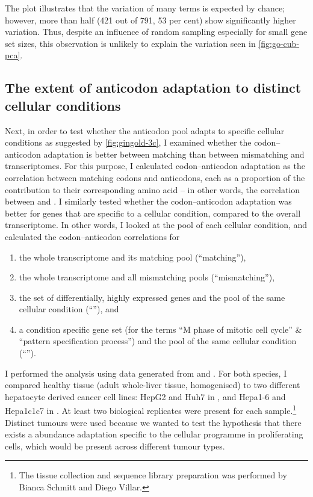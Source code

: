 The plot illustrates that the variation of many \go terms is expected by chance;
however, more than half (\num{421} out of \num{791}, \num{53} per cent) show
significantly higher variation. Thus, despite an influence of random sampling
especially for small gene set sizes, this observation is unlikely to explain the
variation seen in \cref{fig:go-cub-pca}.

\subsection{The extent of anticodon adaptation to distinct cellular conditions}

Next, in order to test whether the anticodon pool adapts to specific cellular
conditions as suggested by \cref{fig:gingold-3c}, I examined whether the
codon--anticodon adaptation is better between matching than between mismatching
\mrna and \trna transcriptomes. For this purpose, I calculated codon--anticodon
adaptation as the correlation between matching codons and anticodons, each as a
proportion of the contribution to their corresponding amino acid -- in other
words, the correlation between \rcu and \raa. I similarly tested whether the
codon--anticodon adaptation was better for genes that are specific to a cellular
condition, compared to the overall transcriptome. In other words, I looked at
the \mrna pool of each cellular condition, and calculated the codon--anticodon
correlations for

\begin{enumerate}
    \item the whole transcriptome and its matching \trna pool (“matching”),
    \item the whole transcriptome and all mismatching \trna pools
        (“mismatching”),
    \item the set of differentially, highly expressed \mrna genes and the
        \trna pool of the same cellular condition (“”), and
    \item a condition specific gene set (for the \go terms “M phase of mitotic
        cell cycle” \& “pattern specification process”) and the \trna pool of
        the same cellular condition (“”).
\end{enumerate}

I performed the analysis using data generated from \mmu and \hsa. For both
species, I compared healthy tissue (adult whole-liver tissue, homogenised) to
two different hepatocyte derived cancer cell lines: HepG2 and Huh7 in \hsa, and
Hepa1-6 and Hepa1c1c7 in \mmu. At least two biological replicates were present
for each sample.\footnote{The tissue collection and sequence library preparation
was performed by Bianca Schmitt and Diego Villar.} Distinct tumours were used
because we wanted to test the hypothesis that there exists a \trna abundance
adaptation specific to the cellular programme in proliferating cells, which
would be present across different tumour types.


